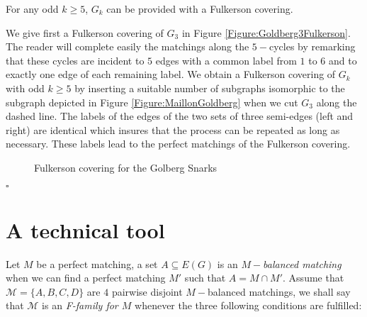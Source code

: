 \documentclass{amsart}
\theoremstyle{definition}
\theoremstyle{remark}
\newenvironment{prf}{{\bf \noindent Proof } }{\hfill$\square$\\}
\begin{document}
\begin{thm}  \label{Theorem:GoldbergSnark} For any odd $k\geq 5$, $G_{k}$ can be
provided with a Fulkerson covering.
\end{thm}
\begin{prf}
We give first a Fulkerson covering of $G_{3}$ in Figure
\ref{Figure:Goldberg3Fulkerson}. The reader will complete easily the
matchings along the $5-$cycles by remarking that these cycles are
incident to $5$ edges with a common label from $1$ to $6$ and to
exactly one edge of each remaining label. We obtain a Fulkerson
covering of $G_{k}$ with odd $k\geq 5$ by inserting a suitable
number of subgraphs isomorphic to the subgraph depicted in Figure
\ref{Figure:MaillonGoldberg} when we cut $G_{3}$ along the dashed
line. The labels of the edges of the two sets of three semi-edges
(left and right) are identical which insures that the process can be
repeated as long as necessary. These labels lead to the perfect
matchings of the Fulkerson covering.
\begin{figure}
\centering 
{}
\caption{Fulkerson covering for the Golberg Snarks}
\end{figure}
\end{prf}


\section{A technical tool}

Let $M$ be a perfect matching, a set $A \subseteq E(G)$ is an {\em
$M-$balanced matching} when we can find a perfect matching $M'$
 such that $A=M \cap M'$. Assume that $\mathcal M=\{A,B,C,D\}$  are $4$
 pairwise disjoint $M-$balanced matchings, we shall say that
 $\mathcal M$ is an {\em F-family for $M$} whenever the three following
 conditions are fulfilled:
\end{document}
